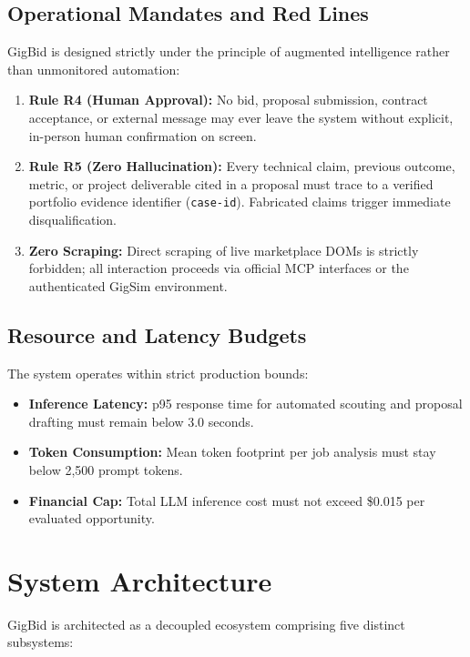 \documentclass[10pt,a4paper,twocolumn]{article}
\begin{document}
\subsection{Operational Mandates and Red Lines}
GigBid is designed strictly under the principle of augmented intelligence rather than unmonitored automation:
\begin{enumerate}[leftmargin=*,noitemsep]
    \item \textbf{Rule R4 (Human Approval):} No bid, proposal submission, contract acceptance, or external message may ever leave the system without explicit, in-person human confirmation on screen.
    \item \textbf{Rule R5 (Zero Hallucination):} Every technical claim, previous outcome, metric, or project deliverable cited in a proposal must trace to a verified portfolio evidence identifier (\texttt{case-id}). Fabricated claims trigger immediate disqualification.
    \item \textbf{Zero Scraping:} Direct scraping of live marketplace DOMs is strictly forbidden; all interaction proceeds via official MCP interfaces or the authenticated GigSim environment.
\end{enumerate}

\subsection{Resource and Latency Budgets}
The system operates within strict production bounds:
\begin{itemize}[leftmargin=*,noitemsep]
    \item \textbf{Inference Latency:} p95 response time for automated scouting and proposal drafting must remain below 3.0 seconds.
    \item \textbf{Token Consumption:} Mean token footprint per job analysis must stay below 2,500 prompt tokens.
    \item \textbf{Financial Cap:} Total LLM inference cost must not exceed \$0.015 per evaluated opportunity.
\end{itemize}

\section{System Architecture}
\label{sec:architecture}
GigBid is architected as a decoupled ecosystem comprising five distinct subsystems:
\end{document}
